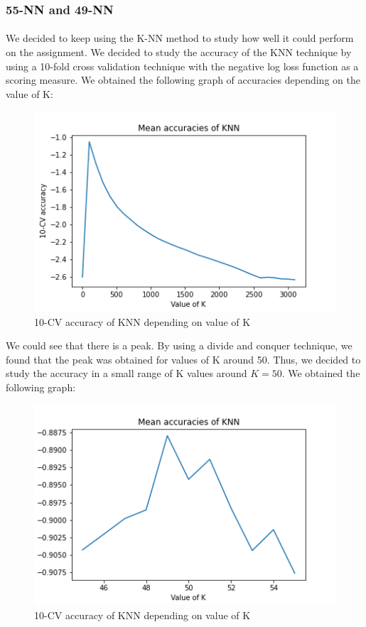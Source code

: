 \documentclass[a4paper, 11pt, oneside]{article}
\begin{document}
\subsubsection{55-NN and 49-NN}
\paragraph{}We decided to keep using the K-NN method to study how well it could perform on the assignment. We decided to study the accuracy of the KNN technique by using a 10-fold cross validation technique with the negative log loss function as a scoring measure. We obtained the following graph of accuracies depending on the value of K:
\begin{figure}[H]
\center
\includegraphics[scale=0.3]{knn/log_loss.png}
\caption{10-CV accuracy of KNN depending on value of K}
\end{figure}
We could see that there is a peak. By using a divide and conquer technique, we found that the peak was obtained for values of K around 50. Thus, we decided to study the accuracy in a small range of K values around $K=50$. We obtained the following graph:
\begin{figure}[H]
\center
\includegraphics[scale=0.4]{knn/log_loss_focused.png}
\caption{10-CV accuracy of KNN depending on value of K}
\label{fig:knn_log_loss_focused}
\end{figure}
\end{document}
